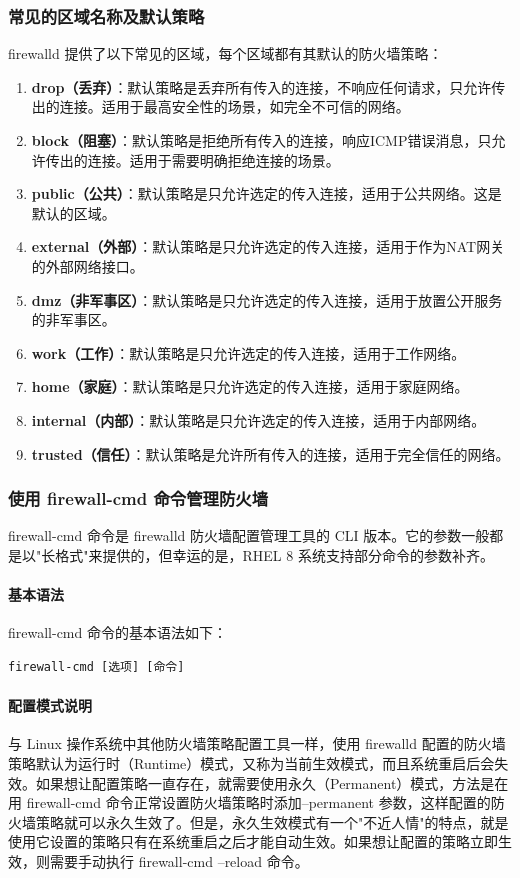 \documentclass[12pt,UTF8]{ctexbook}
\begin{document}
\subsubsection{常见的区域名称及默认策略}
firewalld 提供了以下常见的区域，每个区域都有其默认的防火墙策略：
\begin{enumerate}
    \item \textbf{drop（丢弃）}：默认策略是丢弃所有传入的连接，不响应任何请求，只允许传出的连接。适用于最高安全性的场景，如完全不可信的网络。
    \item \textbf{block（阻塞）}：默认策略是拒绝所有传入的连接，响应ICMP错误消息，只允许传出的连接。适用于需要明确拒绝连接的场景。
    \item \textbf{public（公共）}：默认策略是只允许选定的传入连接，适用于公共网络。这是默认的区域。
    \item \textbf{external（外部）}：默认策略是只允许选定的传入连接，适用于作为NAT网关的外部网络接口。
    \item \textbf{dmz（非军事区）}：默认策略是只允许选定的传入连接，适用于放置公开服务的非军事区。
    \item \textbf{work（工作）}：默认策略是只允许选定的传入连接，适用于工作网络。
    \item \textbf{home（家庭）}：默认策略是只允许选定的传入连接，适用于家庭网络。
    \item \textbf{internal（内部）}：默认策略是只允许选定的传入连接，适用于内部网络。
    \item \textbf{trusted（信任）}：默认策略是允许所有传入的连接，适用于完全信任的网络。
\end{enumerate}

\subsubsection{使用 firewall-cmd 命令管理防火墙}
firewall-cmd 命令是 firewalld 防火墙配置管理工具的 CLI 版本。它的参数一般都是以"长格式"来提供的，但幸运的是，RHEL 8 系统支持部分命令的参数补齐。

\paragraph{基本语法}
firewall-cmd 命令的基本语法如下：
\begin{verbatim}
firewall-cmd [选项] [命令]
\end{verbatim}

\paragraph{配置模式说明}
与 Linux 操作系统中其他防火墙策略配置工具一样，使用 firewalld 配置的防火墙策略默认为运行时（Runtime）模式，又称为当前生效模式，而且系统重启后会失效。如果想让配置策略一直存在，就需要使用永久（Permanent）模式，方法是在用 firewall-cmd 命令正常设置防火墙策略时添加--permanent 参数，这样配置的防火墙策略就可以永久生效了。但是，永久生效模式有一个"不近人情"的特点，就是使用它设置的策略只有在系统重启之后才能自动生效。如果想让配置的策略立即生效，则需要手动执行 firewall-cmd --reload 命令。
\end{document}
